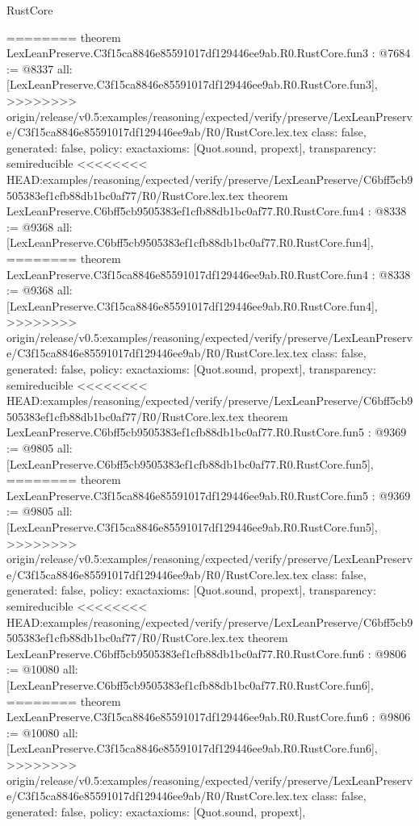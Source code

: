 \begin{lexlean}{RustCore}
\begin{coremodule}
{\begin{coremodule}
{{{{{{========
theorem LexLeanPreserve.C3f15ca8846e85591017df129446ee9ab.R0.RustCore.fun3 : @7684 := @8337 {
  all: [LexLeanPreserve.C3f15ca8846e85591017df129446ee9ab.R0.RustCore.fun3],
>>>>>>>> origin/release/v0.5:examples/reasoning/expected/verify/preserve/LexLeanPreserve/C3f15ca8846e85591017df129446ee9ab/R0/RustCore.lex.tex
  class: false,
  generated: false,
  policy: exact{axioms: [Quot.sound, propext]},
  transparency: semireducible
}
<<<<<<<< HEAD:examples/reasoning/expected/verify/preserve/LexLeanPreserve/C6bff5cb9505383ef1cfb88db1bc0af77/R0/RustCore.lex.tex
theorem LexLeanPreserve.C6bff5cb9505383ef1cfb88db1bc0af77.R0.RustCore.fun4 : @8338 := @9368 {
  all: [LexLeanPreserve.C6bff5cb9505383ef1cfb88db1bc0af77.R0.RustCore.fun4],
========
theorem LexLeanPreserve.C3f15ca8846e85591017df129446ee9ab.R0.RustCore.fun4 : @8338 := @9368 {
  all: [LexLeanPreserve.C3f15ca8846e85591017df129446ee9ab.R0.RustCore.fun4],
>>>>>>>> origin/release/v0.5:examples/reasoning/expected/verify/preserve/LexLeanPreserve/C3f15ca8846e85591017df129446ee9ab/R0/RustCore.lex.tex
  class: false,
  generated: false,
  policy: exact{axioms: [Quot.sound, propext]},
  transparency: semireducible
}
<<<<<<<< HEAD:examples/reasoning/expected/verify/preserve/LexLeanPreserve/C6bff5cb9505383ef1cfb88db1bc0af77/R0/RustCore.lex.tex
theorem LexLeanPreserve.C6bff5cb9505383ef1cfb88db1bc0af77.R0.RustCore.fun5 : @9369 := @9805 {
  all: [LexLeanPreserve.C6bff5cb9505383ef1cfb88db1bc0af77.R0.RustCore.fun5],
========
theorem LexLeanPreserve.C3f15ca8846e85591017df129446ee9ab.R0.RustCore.fun5 : @9369 := @9805 {
  all: [LexLeanPreserve.C3f15ca8846e85591017df129446ee9ab.R0.RustCore.fun5],
>>>>>>>> origin/release/v0.5:examples/reasoning/expected/verify/preserve/LexLeanPreserve/C3f15ca8846e85591017df129446ee9ab/R0/RustCore.lex.tex
  class: false,
  generated: false,
  policy: exact{axioms: [Quot.sound, propext]},
  transparency: semireducible
}
<<<<<<<< HEAD:examples/reasoning/expected/verify/preserve/LexLeanPreserve/C6bff5cb9505383ef1cfb88db1bc0af77/R0/RustCore.lex.tex
theorem LexLeanPreserve.C6bff5cb9505383ef1cfb88db1bc0af77.R0.RustCore.fun6 : @9806 := @10080 {
  all: [LexLeanPreserve.C6bff5cb9505383ef1cfb88db1bc0af77.R0.RustCore.fun6],
========
theorem LexLeanPreserve.C3f15ca8846e85591017df129446ee9ab.R0.RustCore.fun6 : @9806 := @10080 {
  all: [LexLeanPreserve.C3f15ca8846e85591017df129446ee9ab.R0.RustCore.fun6],
>>>>>>>> origin/release/v0.5:examples/reasoning/expected/verify/preserve/LexLeanPreserve/C3f15ca8846e85591017df129446ee9ab/R0/RustCore.lex.tex
  class: false,
  generated: false,
  policy: exact{axioms: [Quot.sound, propext]},
}}}}}}}}}}
\end{coremodule}}
\end{coremodule}
\end{lexlean}
